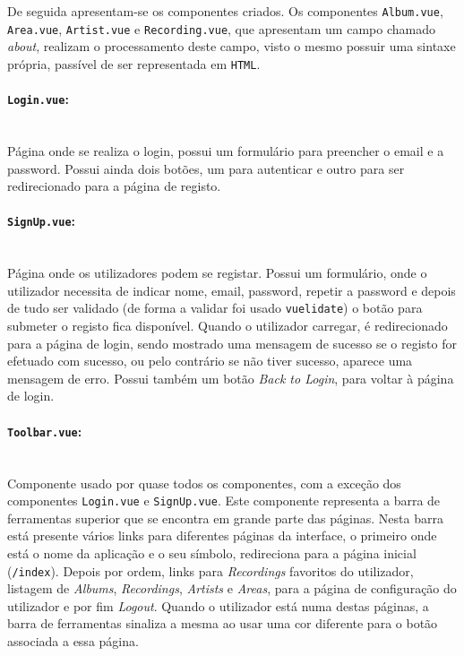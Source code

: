 \documentclass{article}
\begin{document}
\vspace{10px}

De seguida apresentam-se os componentes criados. Os componentes \texttt{Album.vue}, \texttt{Area.vue}, \texttt{Artist.vue} e \texttt{Recording.vue}, que apresentam um campo chamado \textit{about}, realizam o processamento deste campo, visto o mesmo possuir uma sintaxe própria, passível de ser representada em \texttt{HTML}.

\paragraph{\texttt{Login.vue}:}\mbox{}\\

Página onde se realiza o login, possui um formulário para preencher o email e a password. Possui ainda dois botões, um para autenticar e outro para ser redirecionado para a página de registo.

\paragraph{\texttt{SignUp.vue}:}\mbox{}\\

Página onde os utilizadores podem se registar. Possui um formulário, onde o utilizador necessita de indicar nome, email, password, repetir a password e depois de tudo ser validado (de forma a validar foi usado \texttt{vuelidate}) o botão para submeter o registo fica disponível. Quando o utilizador carregar, é redirecionado para a página de login, sendo mostrado uma mensagem de sucesso se o registo for efetuado com sucesso, ou pelo contrário se não tiver sucesso, aparece uma mensagem de erro. Possui também um botão \textit{Back to Login}, para voltar à página de login.

\paragraph{\texttt{Toolbar.vue}:}\mbox{}\\

Componente usado por quase todos os componentes, com a exceção dos componentes \texttt{Login.vue} e \texttt{SignUp.vue}. Este componente representa a barra de ferramentas superior que se encontra em grande parte das páginas. Nesta barra está presente vários links para diferentes páginas da interface, o primeiro onde está o nome da aplicação e o seu símbolo, redireciona para a página inicial (\texttt{/index}). Depois por ordem, links para \textit{Recordings} favoritos do utilizador, listagem de \textit{Albums}, \textit{Recordings}, \textit{Artists} e \textit{Areas}, para a página de configuração do utilizador e por fim \textit{Logout}. Quando o utilizador está numa destas páginas, a barra de ferramentas sinaliza a mesma ao usar uma cor diferente para o botão associada a essa página.
\end{document}
